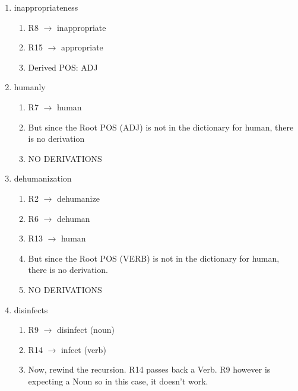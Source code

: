 \documentclass[11pt]{article}
\begin{document}
\begin{enumerate}
\begin{enumerate}
\begin{enumerate}
    \end{enumerate}        


\item inappropriateness  

    \begin{enumerate}
    
    \item R8 $\rightarrow$ inappropriate
    \item R15 $\rightarrow$ appropriate
    \item Derived POS: ADJ
    
    \end{enumerate}    

\item humanly  

    \begin{enumerate}
    
    \item R7 $\rightarrow$ human
    \item But since the Root POS (ADJ) is not in the dictionary for human, there is no derivation
    \item NO DERIVATIONS
    
    \end{enumerate} 
    

\item dehumanization

    \begin{enumerate}
    
    \item R2 $\rightarrow$ dehumanize
    \item R6 $\rightarrow$ dehuman
    \item R13 $\rightarrow$ human
    \item But since the Root POS (VERB) is not in the dictionary for human, there is no derivation.
    \item NO DERIVATIONS
    
    \end{enumerate} 

\item disinfects 

    \begin{enumerate}
    
    \item R9 $\rightarrow$ disinfect (noun)
    \item R14 $\rightarrow$ infect (verb)
    \item Now, rewind the recursion. R14 passes back a Verb. R9 however is expecting a Noun so in this case, it doesn't work.
    

\end{enumerate}
\end{enumerate}
\end{enumerate}
\end{document}
